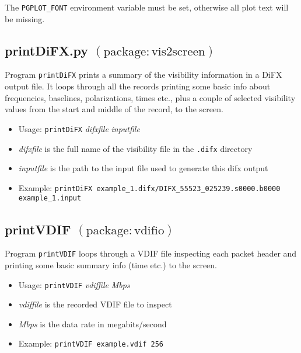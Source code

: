 The {\tt PGPLOT\_FONT} environment variable must be set, otherwise all plot text will be missing.








\subsection{printDiFX.py {\small $\mathrm{(package: vis2screen)}$} \label{sec:printDiFX}}

Program {\tt printDiFX} prints a summary of the visibility information in a DiFX output file.
It loops through all the records printing some basic info about frequencies, baselines, polarizations, times etc., plus a couple of selected visibility values from the start and middle of the record, to the screen.

\begin{itemize}
\item[] Usage: {\tt printDiFX} {\em difxfile} {\em inputfile}

\item[] {\em difxfile} is the full name of the visibility file in the {\tt .difx} directory
\item[] {\em inputfile} is the path to the input file used to generate this difx output
\end{itemize}
\begin{itemize}
\item[] Example: {\tt printDiFX example\_1.difx/DIFX\_55523\_025239.s0000.b0000 example\_1.input}
\end{itemize}





\subsection{printVDIF {\small $\mathrm{(package: vdifio)}$} \label{sec:printVDIF}}

Program {\tt printVDIF} loops through a VDIF file inspecting each packet header and printing some basic summary info (time etc.) to the screen.

\begin{itemize}
\item[] Usage: {\tt printVDIF} {\em vdiffile} {\em Mbps}

\item[] {\em vdiffile} is the recorded VDIF file to inspect
\item[] {\em Mbps} is the data rate in megabits/second

\item[] Example: {\tt printVDIF example.vdif 256}
\end{itemize}



